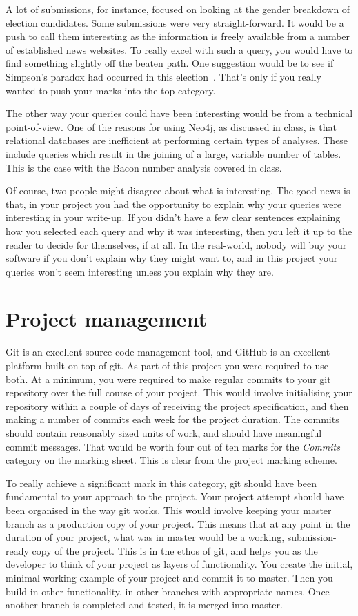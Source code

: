 A lot of submissions, for instance, focused on looking at the gender breakdown of election candidates.
Some submissions were very straight-forward.
It would be a push to call them interesting as the information is freely available from a number of established news websites.
To really excel with such a query, you would have to find something slightly off the beaten path.
One suggestion would be to see if Simpson's paradox had occurred in this election~\cite{ucberkgender}.
That's only if you really wanted to push your marks into the top category.

The other way your queries could have been interesting would be from a technical point-of-view.
One of the reasons for using Neo4j, as discussed in class, is that relational databases are inefficient at performing certain types of analyses.
These include queries which result in the joining of a large, variable number of tables.
This is the case with the Bacon number analysis covered in class.

Of course, two people might disagree about what is interesting.
The good news is that, in your project you had the opportunity to explain why your queries were interesting in your write-up.
If you didn't have a few clear sentences explaining how you selected each query and why it was interesting, then you left it up to the reader to decide for themselves, if at all.
In the real-world, nobody will buy your software if you don't explain why they might want to, and in this project your queries won't seem interesting unless you explain why they are.

\section*{Project management}
Git is an excellent source code management tool, and GitHub is an excellent platform built on top of git.
As part of this project you were required to use both.
At a minimum, you were required to make regular commits to your git repository over the full course of your project.
This would involve initialising your repository within a couple of days of receiving the project specification, and then making a number of commits each week for the project duration.
The commits should contain reasonably sized units of work, and should have meaningful commit messages.
That would be worth four out of ten marks for the \emph{Commits} category on the marking sheet.
This is clear from the project marking scheme.

To really achieve a significant mark in this category, git should have been fundamental to your approach to the project.
Your project attempt should have been organised in the way git works.
This would involve keeping your master branch as a production copy of your project.
This means that at any point in the duration of your project, what was in master would be a working, submission-ready copy of the project.
This is in the ethos of git, and helps you as the developer to think of your project as layers of functionality.
You create the initial, minimal working example of your project and commit it to master.
Then you build in other functionality, in other branches with appropriate names.
Once another branch is completed and tested, it is merged into master.


